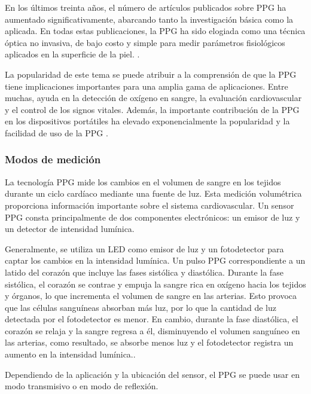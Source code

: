             En los últimos treinta años, el número de artículos publicados sobre PPG ha aumentado significativamente, abarcando tanto la investigación básica como la aplicada. En todas estas publicaciones, la PPG ha sido elogiada como una técnica óptica no invasiva, de bajo costo y simple para medir parámetros fisiológicos aplicados en la superficie de la piel. \cite{PPG}.

            La popularidad de este tema se puede atribuir a la comprensión de que la PPG tiene implicaciones importantes para una amplia gama de aplicaciones. Entre muchas, ayuda en la detección de oxígeno en sangre, la evaluación cardiovascular y el control de los signos vitales. Además, la importante contribución de la PPG en los dispositivos portátiles ha elevado exponencialmente la popularidad y la facilidad de uso de la PPG \cite{allen_2007}.

        \subsubsection{Modos de medición}
            La tecnología PPG mide los cambios en el volumen de sangre en los tejidos durante un ciclo cardíaco mediante una fuente de luz. Esta medición volumétrica proporciona información importante sobre el sistema cardiovascular. Un sensor PPG consta principalmente de dos componentes electrónicos: un emisor de luz y un detector de intensidad lumínica.

            Generalmente, se utiliza un LED como emisor de luz y un fotodetector para captar los cambios en la intensidad lumínica. Un pulso PPG correspondiente a un latido del corazón que incluye las fases sistólica y diastólica. Durante la fase sistólica, el corazón se contrae y empuja la sangre rica en oxígeno hacia los tejidos y órganos, lo que incrementa el volumen de sangre en las arterias. Esto provoca que las células sanguíneas absorban más luz, por lo que la cantidad de luz detectada por el fotodetector es menor. En cambio, durante la fase diastólica, el corazón se relaja y la sangre regresa a él, disminuyendo el volumen sanguíneo en las arterias, como resultado, se absorbe menos luz y el fotodetector registra un aumento en la intensidad lumínica.\cite{Hiiberia_2023}.

            Dependiendo de la aplicación y la ubicación del sensor, el PPG se puede usar en modo transmisivo o en modo de reflexión.

